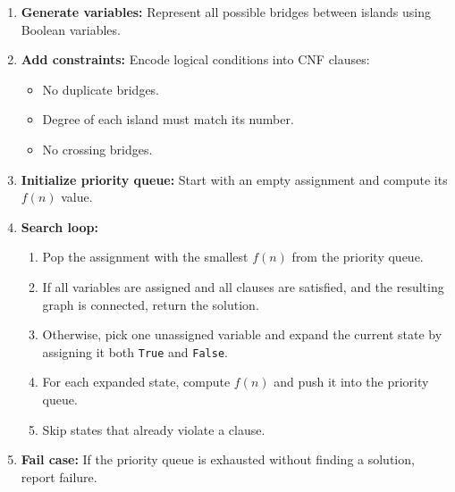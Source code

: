 \begin{enumerate}
  \item \textbf{Generate variables:} Represent all possible bridges between islands using Boolean variables.

  \item \textbf{Add constraints:} Encode logical conditions into CNF clauses:
  \begin{itemize}
    \item No duplicate bridges.
    \item Degree of each island must match its number.
    \item No crossing bridges.
  \end{itemize}

  \item \textbf{Initialize priority queue:} Start with an empty assignment and compute its $f(n)$ value.

  \item \textbf{Search loop:}
  \begin{enumerate}
    \item Pop the assignment with the smallest $f(n)$ from the priority queue.
    \item If all variables are assigned and all clauses are satisfied, and the resulting graph is connected, return the solution.
    \item Otherwise, pick one unassigned variable and expand the current state by assigning it both \texttt{True} and \texttt{False}.
    \item For each expanded state, compute $f(n)$ and push it into the priority queue.
    \item Skip states that already violate a clause.
  \end{enumerate}

  \item \textbf{Fail case:} If the priority queue is exhausted without finding a solution, report failure.
\end{enumerate}
